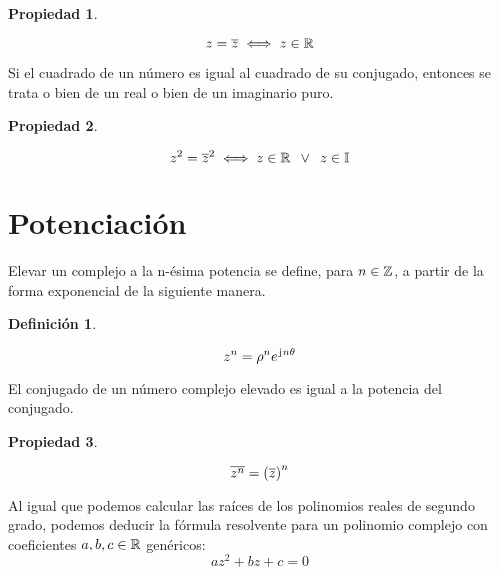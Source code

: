\documentclass[a5paper,12pt,twoside]{book}
\newtheorem{defn}{{Definición}}[chapter]
\newtheorem{prop}{{Propiedad}}[chapter]
\begin{document}
\begin{mdframed}[style=PropertyFrame]
    \begin{prop}
    \end{prop}
    \begin{equation*}
        z = \overline{z} \iff z \in \mathbb{R}
    \end{equation*}
\end{mdframed}

Si el cuadrado de un número es igual al cuadrado de su conjugado, entonces se trata o bien de un real o bien de un imaginario puro.

\begin{mdframed}[style=PropertyFrame]
    \begin{prop}
    \end{prop}
    \begin{equation*}
        z^2=\overline{z}^2 \iff z \in \mathbb{R} \enspace \lor \enspace z \in \mathbb{I}
    \end{equation*}
\end{mdframed}


\section{Potenciación}

Elevar un complejo a la n-ésima potencia se define, para $n \in \mathbb{Z}$, a partir de la forma exponencial de la siguiente manera.

\begin{mdframed}[style=DefinitionFrame]
    \begin{defn}
        \label{defn:nPower}
    \end{defn}
    \begin{equation*}
        z^n = \rho^n e^{\mkern2mu\mathrm{j}\mkern1mu n \theta}
    \end{equation*}
\end{mdframed}

El conjugado de un número complejo elevado es igual a la potencia del conjugado.

\begin{mdframed}[style=PropertyFrame]
    \begin{prop}
    \end{prop}
    \begin{equation*}
        \overline{z^n} = \left( \overline{z} \right)^n
    \end{equation*}
\end{mdframed}

Al igual que podemos calcular las raíces de los polinomios reales de segundo grado, podemos deducir la fórmula resolvente para un polinomio complejo con coeficientes $a,b,c \in \mathbb{R}$ genéricos:
\begin{equation*}
    az^2 + bz + c = 0
\end{equation*}
\end{document}
